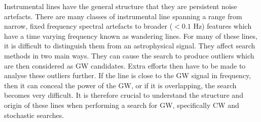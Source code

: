 %

Instrumental lines have the general structure that they are persistent noise artefacts.
There are many classes of instrumental line spanning a range from narrow, fixed frequency spectral artefacts to broader ($<0.1$ Hz) features which have a time varying frequency known as wandering lines.
For many of these lines, it is difficult to distinguish them from an astrophysical signal.
They affect search methods in two main ways. 
They can cause the search to produce outliers which are then considered as \gls{GW} candidates.
Extra efforts then have to be made to analyse these outliers further.
If the line is close to the \gls{GW} signal in frequency, then it can conceal the power of the \gls{GW}, or if it is overlapping, the search becomes very difficult.
It is therefore crucial to understand the structure and origin of these lines when performing a search for \gls{GW}, specifically \gls{CW} and stochastic searches.

%


